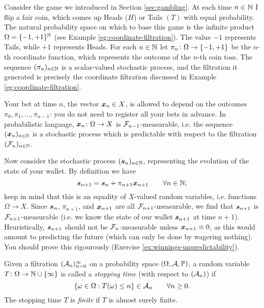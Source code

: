 \begin{example}\label{eg:gambling-filtrations}
  Consider the game we introduced in Section \ref{sec:gambling}.
  At each time $n \in \mathbb{N}$ I flip a fair coin, which comes up Heads ($H$) or Tails $(T)$ with equal probability.
  The natural probability space on which to base this game is the infinite product $\Omega = \{-1,+1\}^{\mathbb{N}}$ (see Example \ref{eg:coordinate-filtration}).
  The value $-1$ represents Tails, while $+1$ represents Heads.
  For each $n \in \mathbb{N}$ let $\pi_n \colon \Omega \rightarrow \{-1,+1\}$ be the $n$-th coordinate function, which represents the outcome of the $n$-th coin toss.
  The sequence $(\pi_n)_{n \in \mathbb{N}}$ is a scalar-valued stochastic process, and the filtration it generated is precisely the coordinate filtration discussed in Example \ref{eg:coordinate-filtration}.

  
  Your bet at time $n$, the vector $\bm{x}_n \in X$, is allowed to depend on the outcomes $\pi_0, \pi_1, \ldots, \pi_{n-1}$: you do not need to register all your bets in advance.
  In probabilistic language, $\bm{x}_n \colon \Omega \rightarrow X$ is $\mathcal{F}_{n-1}$-measurable, i.e. the sequence $(\bm{x}_n)_{n \in \mathbb{N}}$ is a stochastic process which is predictable with respect to the filtration $(\mathcal{F}_n)_{n \in \mathbb{N}}$.

  Now consider the stochastic process $(\bm{s}_n)_{n \in \mathbb{N}}$, representing the evolution of the state of your wallet.
  By definition we have
  \begin{equation*}
    \bm{s}_{n+1} = \bm{s}_n + \pi_{n+1} \bm{x}_{n+1} \qquad \forall n \in \mathbb{N};
  \end{equation*}
  keep in mind that this is an equality of $X$-valued random variables, i.e. functions $\Omega \to X$.
  Since $\bm{s}_n$, $\pi_{n+1}$, and $\bm{x}_{n+1}$ are all $\mathcal{F}_{n+1}$-measurable, we find that $\bm{s}_{n+1}$ is $\mathcal{F}_{n+1}$-measurable (i.e. we know the state of our wallet $\bm{s}_{n+1}$ at time $n+1$).
  Heuristically, $\bm{s}_{n+1}$ should not be $\mathcal{F}_n$-measurable unless $\bm{x}_{n+1} \equiv 0$, as this would amount to predicting the future (which can only be done by wagering nothing).
  You should prove this rigourously (Exercise \ref{ex:winnings-unpredictability}).
\end{example}


\begin{defn}
  Given a filtration $(\mathcal{A}_n)_{n=0}^\infty$ on a probability space $(\Omega, \mathcal{A}, \mathbb{P})$, a random variable $T \colon \Omega \rightarrow \mathbb{N} \cup \{\infty\}$ is called a \emph{stopping time} (with respect to $(\mathcal{A}_n)$) if 
  \begin{equation*}
    \{\omega \in \Omega: T(\omega) \leq n\} \in \mathcal{A}_n \qquad \forall n \geq 0.
  \end{equation*}
  The stopping time $T$ is \emph{finite} if $T$ is almost surely finite.
\end{defn}

